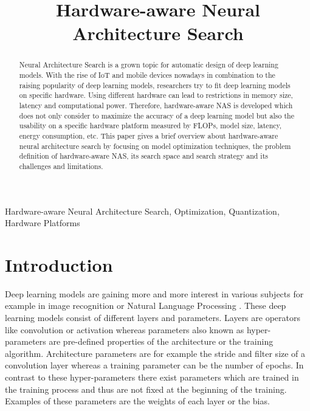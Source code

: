 \documentclass[conference]{IEEEtran}
\begin{document}
\title{Hardware-aware Neural Architecture Search\\}

\author{
}

\maketitle

\begin{abstract}
Neural Architecture Search is a grown topic for automatic design of deep learning models. With the rise of IoT and mobile devices nowadays in combination to the raising popularity of deep learning models, researchers try to fit deep learning models on specific hardware. Using different hardware can lead to restrictions in memory size, latency and computational power. Therefore, hardware-aware NAS is developed which does not only consider to maximize the accuracy of a deep learning model but also the usability on a specific hardware platform measured by FLOPs, model size, latency, energy consumption, etc. This paper gives a brief overview about hardware-aware neural architecture search by focusing on model optimization techniques, the problem definition of hardware-aware NAS, its search space and search strategy and its challenges and limitations.  
\end{abstract}

\begin{IEEEkeywords}
Hardware-aware Neural Architecture Search, Optimization, Quantization, Hardware Platforms
\end{IEEEkeywords}

\section{Introduction}
\label{section:Introduction}
Deep learning models are gaining more and more interest in various subjects for example in image recognition \cite{bib2} or Natural Language Processing \cite{bib3}. These deep learning models consist of different layers and parameters. Layers are operators like convolution or activation whereas parameters also known as hyper-parameters are pre-defined properties of the architecture or the training algorithm. Architecture parameters are for example the stride and filter size of a convolution layer whereas a training parameter can be the number of epochs. In contrast to these hyper-parameters there exist parameters which are trained in the training process and thus are not fixed at the beginning of the training. Examples of these parameters are the weights of each layer or the bias. 
\end{document}
